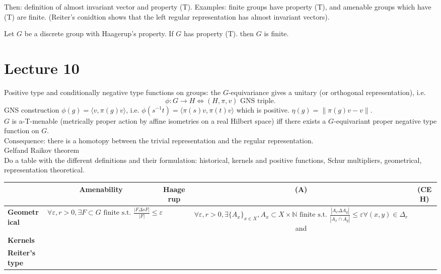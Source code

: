 Then: definition of almost invariant vector and property (T). Examples: finite groups have property (T), and amenable groups which have (T) are finite. (Reiter's conidtion shows that the left regular representation has almost invariant vectors).

\begin{prop}
Let $G$ be a discrete group with Haagerup's property. If $G$ has property (T). then $G$ is finite.
\end{prop}

\section{Lecture 10}
Positive type and conditionally negative type functions on groups: the $G$-equivariance gives a unitary (or orthogonal representation), i.e.
\[\phi: G\rightarrow H \iff (H,\pi,v) \text{ GNS triple}.\] 
GNS construction $\phi(g) = \langle v,\pi(g)v\rangle$, i.e. $\phi(s^{-1}t) = \langle \pi(s)v,\pi(t)v\rangle$ which is positive. $\eta(g)= \|\pi(g)v -v\|$. \\

$G$ is a-T-menable (metrically proper action by affine isometries on a real Hilbert space) iff there exists a $G$-equivariant proper negative type function on $G$.\\

Consequence: there is a homotopy between the trivial representation and the regular representation.\\

Gelfand Raikov theorem\\

Do a table with the different definitions and their formulation: historical, kernels and positive functions, Schur multipliers, geometrical, representation theoretical.

\begin{table}[h]
\begin{tabular}{c|c|c|c|c|}
\cline{2-5}
                                                         & \textbf{Amenability} & \textbf{Haagerup} & \textbf{(A)}            & \textbf{(CEH)}  \\ \hline
\multicolumn{1}{|l|}{\textbf{Geometrical}}                   &  $\forall \varepsilon, r>0, \exists F\subset G \text{ finite s.t. 	}\frac{|F\Delta s F|}{|F|}\leq \varepsilon$  &                   & $\forall \varepsilon, r>0, \exists \{A_x\}_{x\in X}, A_x\subset X\times \mathbb N \text{ finite s.t. 	}\frac{|A_x\Delta A_y|}{|A_x\cap A_y|}\leq \varepsilon \forall (x,y)\in \Delta_r$ and                 &                       \\ \hline
\multicolumn{1}{|l|}{\textbf{Kernels}}                   &                     &                   &                      &                       \\ \hline
\multicolumn{1}{|l|}{\textbf{Reiter's type}}                   &                     &                   &                      &                       \\ \hline
\hline
\end{tabular}
\end{table} 

